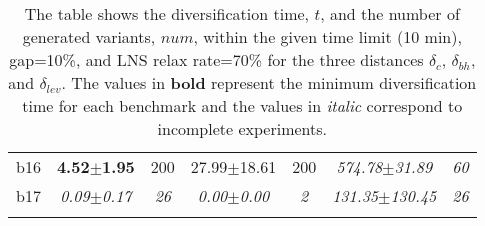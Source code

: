 \begin{longtable}{|l|c|c|c|c|c|c|}
b16&\textbf{4.52$\pm$1.95} & 200 &27.99$\pm$18.61 & 200 &\textit{574.78$\pm$31.89} & \textit{60 }
\\
b17&\textit{0.09$\pm$0.17} & \textit{26 }&\textit{0.00$\pm$0.00} & \textit{2 }&\textit{131.35$\pm$130.45} & \textit{26 }
\\
\hline
\caption{\label{tab:distances}{The table shows 
		      the diversification time, $t$, and the number of generated
		      variants, $num$, within the given time limit (10 min), gap=10\%,
		      and \ac{LNS} relax rate=70\%
		      for the three distances $\delta_c$, $\delta_{bh}$,
		      and $\delta_{lev}$.
		      The values in  \textbf{bold} represent the minimum 
		      diversification time for each benchmark and the values in \emph{italic} 
		      correspond to incomplete experiments.}}
\end{longtable}
